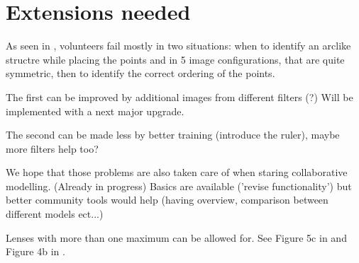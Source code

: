 \section{Extensions needed} \label{sec:todo}

As seen in , volunteers fail mostly in two situations:
when to identify an arclike structre while placing the points
and in 5 image configurations, that are quite symmetric, then to identify the correct ordering of the points.

The first can be improved by additional images from different filters (?)
Will be implemented with a next major \spl upgrade.

The second can be made less by better training (introduce the ruler), maybe more filters help too?

We hope that those problems are also taken care of when staring collaborative modelling. (Already in progress)
Basics are available ('revise functionality') but better community tools would help (having overview, comparison between different models ect...)

Lenses with more than one maximum can be allowed for.  See Figure 5c
in \citep{2001ApJ...557..594R} and Figure 4b in
\cite{2003ApJ...590...39K}.

